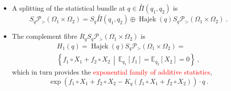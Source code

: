 \documentclass[xcolor=svgnames]{beamer}
\DeclareMathOperator{\Hajek}{Hajek}
\newcommand{\expectat}[2]{\mathbb E_{#1}\left[#2\right]}
\newcommand{\expfibreat}[2]{S_{#1}#2}
\newcommand{\expof}[1]{\exp\left(#1\right)}
\newcommand{\hajekof}[1]{\Hajek\left(#1\right)}
\newcommand{\openplan}[2]{\overset{\circ}\Pi\left(#1,#2\right)}
\newcommand{\opensimplexon}[1]{\mathcal P_>\left(#1\right)}
\newcommand{\rosso}[1]{\textcolor{red}{#1}}
\newcommand{\setof}[2]{\left\{#1 \, \middle| \, #2 \right\}}
\renewcommand{\emph}{\rosso}
\begin{document}
\begin{frame}
\begin{itemize}\item A splitting of the statistical bundle at $q \in \openplan{q_1}{q_2}$ is
\begin{equation*}
    \expfibreat q \opensimplexon{\Omega_1 \times \Omega_2} = S_q \openplan{q_1}{q_2} \oplus \hajekof{q}\expfibreat q \opensimplexon{\Omega_1 \times \Omega_2} \ .
\end{equation*}

\item The complement fibre $R_q \expfibreat q {\opensimplexon{\Omega_1 \times \Omega_2}}$ is 
\begin{multline*}
 H_1(q) =  \hajekof{q}\expfibreat q \opensimplexon{\Omega_1 \times \Omega_2} = \\ \setof {f_1 \circ X_1 + f_2 \circ X_2}{\expectat {q_1}{f_1} = \expectat {q_2}{X_2} = 0} \ ,
 \end{multline*}
  which in turn provides the \emph{exponential family of additive statistics}, 
  \begin{equation*}
      \expof{f_1 \circ X_1 + f_2 \circ X_2 - K_q(f_1 \circ X_1 + f_2 \circ X_2)} \cdot q \ .
  \end{equation*}
\end{itemize}
\end{frame}
\end{document}

